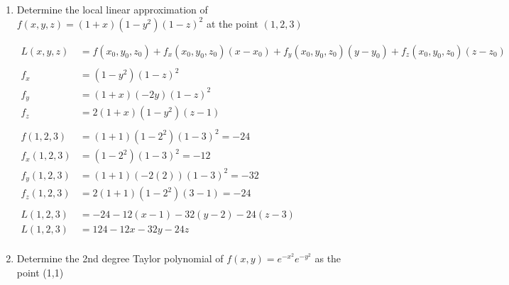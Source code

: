 \documentclass[a4paper,11pt]{article}
\begin{document}
\begin{enumerate}
\begin{enumerate}
        \newpage
        \item Determine the local linear approximation of $f(x, y, z) = (1+x)(1-y^2)(1-z)^2$ at the point $(1, 2, 3)$
        
        \begin{align*}
            L(x,y,z) &= f(x_0, y_0, z_0) + f_x(x_0, y_0, z_0)(x-x_0) + f_y(x_0, y_0, z_0)(y-y_0) + f_z(x_0, y_0, z_0)(z-z_0)\\\\
            f_{x}        & = (1-y^2)(1-z)^2                               \\
            f_{y}        & = (1+x)(-2y)(1-z)^2                            \\
            f_{z}        & = 2(1+x)(1-y^2)(z-1)                           \\\\
            f(1,2,3)     & = (1+1)(1-2^2)(1-3)^2=-24                      \\  
            f_{x}(1,2,3) & = (1-2^2)(1-3)^2=-12                           \\
            f_{y}(1,2,3) & = (1+1)(-2(2))(1-3)^2=-32                      \\
            f_{z}(1,2,3) & = 2(1+1)(1-2^2)(3-1)=-24                       \\\\
            L(1,2,3)     & = -24 -12(x - 1) -32(y - 2) -24(z - 3)\\
            L (1,2,3)    & = 124-12x-32y-24z\\
        \end{align*}
    
        \item Determine the 2nd degree Taylor polynomial of $ f(x,y) = e^{-x^2}e^{-y^2} $ as the point (1,1)


\end{enumerate}
\end{enumerate}
\end{document}
